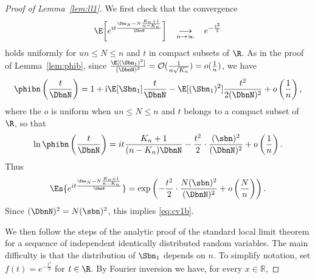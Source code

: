 \begin{proof}[Proof of Lemma~\ref{lem:ll1}]
We first check that the convergence
\begin{equation}
\label{eq:cv1b}\E\bigg[e^{i t \frac{\Sbn_{N}-N \frac{K_{n}+1}{n-K_{n}} }{ \DbnN }} \bigg]  \quad \mathop{\longrightarrow}_{n \rightarrow \infty} \quad e^{- \frac{t^{2}}{2}}
\end{equation}
holds uniformly for $un \leq N \leq n$ and $t$ in compact subsets of $\R$.  As in the proof of Lemma~\ref{lem:phib}, since $\tfrac{\E[(\Sbn_{1})^{3}]}{(\DbnN)^{3}}=\mathcal O(\tfrac{1}{n \sqrt{K_{n}}})= o(\frac{1}{n})$, we have
\[\phibn\left( \frac{t}{ \DbnN } \right)=1+\textrm{i}\E[\Sbn_{1}] \frac{t}{ \DbnN } - \E[(\Sbn_{1})^{2}] \frac{t^{2}}{2(\DbnN)^{2}}+ o \left( \frac{1}{n} \right),\]
where the $o$ is uniform when $un \leq N \leq n$ and $t$ belongs to a compact subset of $\R$, so that
\[\ln \phibn \left( \frac{t}{ \DbnN } \right)=it  \frac{K_{n}+1}{(n-K_{n})\DbnN} - \frac{t^{2}}{2} \cdot \frac{(\sbn)^{2}}{(\DbnN )^{2}}+ o \left( \frac{1}{n} \right).\]
Thus
\[\Es{e^{i t \frac{\Sbn_{N}-N \frac{K_{n}+1}{n-K_{n}} }{ \DbnN }}}= \exp \left(- \frac{t^{2}}{2} \cdot  \frac{ N (\sbn)^{2} }{(\DbnN)^{2}} + o \left( \frac{N}{n} \right)   \right).\]
Since $(\DbnN)^{2}= N (\sbn)^{2}$, this  implies \eqref{eq:cv1b}.


We then follow the steps of the analytic proof of the standard local limit theorem for a sequence of independent identically distributed random variables. The main difficulty is that the distribution of $\Sbn_{1}$ depends on $n$. To simplify notation, set $f(t)= e^{- \frac{t^{2}}{2}}$ for $t \in \R$. By Fourier inversion we have, for every $x \in \mathbb{R}$,


\end{proof}
